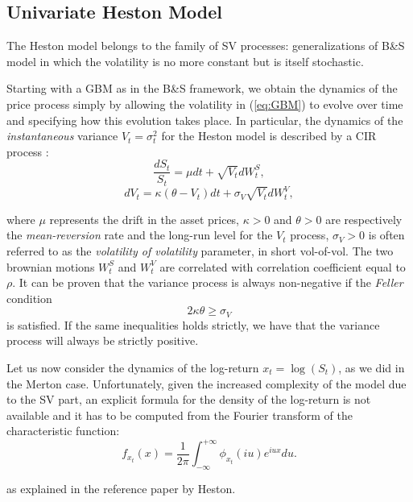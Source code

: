 \subsection{Univariate Heston Model}
The Heston model belongs to the family of SV processes: generalizations of B\&S model in which the volatility is no more constant but is itself  stochastic.

Starting with a GBM as in the B\&S framework, we obtain the dynamics of the price process simply by allowing the volatility in (\ref{eq:GBM}) to evolve over time and specifying how this evolution takes place.
In particular, the dynamics of the \textit{instantaneous} variance $V_t = \sigma_t^2$ for the Heston model is described by a CIR process :
\begin{equation}
\label{eq:heston_price}
	\frac{dS_t}{S_t} = \mu dt +\sqrt{ V_t} dW_t^S,
\end{equation}
\begin{equation}
\label{eq:heston_variance}
	dV_t = \kappa (\theta - V_t) dt + \sigma_V \sqrt{V_t} dW_t^V,
\end{equation}

where $\mu$ represents the drift in the asset prices, $\kappa>0$ and $\theta>0$ are respectively the \textit{mean-reversion} rate  and the long-run level for the $V_t$ process, $\sigma_V>0$ is often referred to as the \textit{volatility of volatility} parameter, in short vol-of-vol.
The two brownian motions $W_t^S$ and $W_t^V$ are correlated with correlation coefficient equal to $\rho$.
It can be proven that the variance process is always non-negative if the \textit{Feller} condition
 \begin{equation}
 \label{eq:feller_condition}
	2\kappa\theta \geq \sigma_V
 \end{equation} 
 is satisfied. If the same inequalities holds strictly, we have that the variance process will always be strictly positive.

Let us now consider the dynamics of the log-return $x_t = \log (S_t)$, as we did in the Merton case. 
Unfortunately, given the increased complexity of the model due to the SV part, an explicit formula for the density of the log-return is not available and it has to be computed from the Fourier transform of the characteristic function:
\begin{equation}
\label{eq:chf_inversion}
f_{x_t}(x) = \frac{1}{2\pi}\int_{-\infty}^{+\infty} \phi_{x_t}(i u) e^{i u x} du .
\end{equation}

as explained in the reference paper by Heston.

